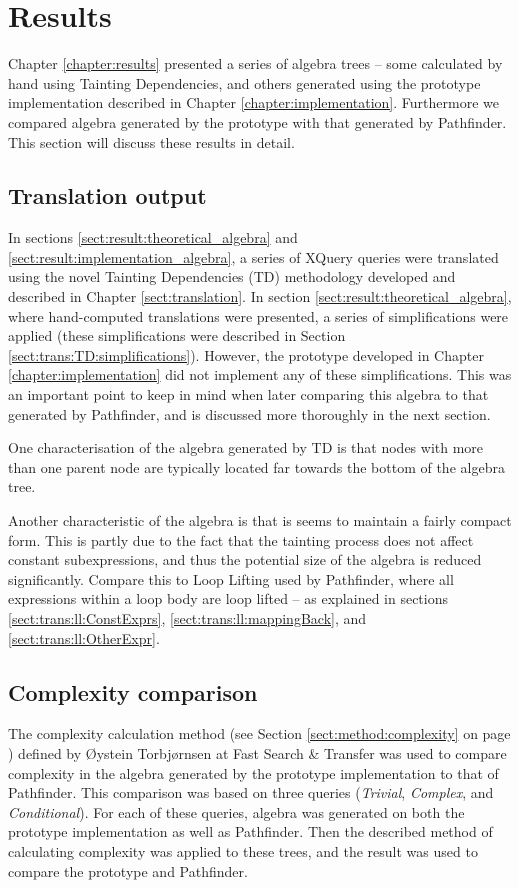 \section{Results}
\label{sect:disc:res}
Chapter \ref{chapter:results} presented a series of algebra trees --
some calculated by hand using Tainting Dependencies, and others generated using
the prototype implementation described in Chapter \ref{chapter:implementation}.
Furthermore we compared algebra generated by the prototype with that generated
by Pathfinder. This section will discuss these results in detail.

\subsection{Translation output}
\label{sect:disc:res:translation_output}
In sections \ref{sect:result:theoretical_algebra} and
\ref{sect:result:implementation_algebra}, a series of XQuery queries were
translated using the novel Tainting Dependencies (TD) methodology developed
and described in Chapter \ref{sect:translation}. In section
\ref{sect:result:theoretical_algebra}, where hand-computed translations were
presented, a series of simplifications were applied (these simplifications were
described in Section \ref{sect:trans:TD:simplifications}). However, the
prototype developed in Chapter \ref{chapter:implementation} did not implement
any of these simplifications. This was an important point to keep in mind when
later comparing this algebra to that generated by Pathfinder, and is
discussed more thoroughly in the next section.

One characterisation of the algebra generated by TD is that nodes with more
than one parent node are typically located far towards the bottom of the algebra
tree. 

Another characteristic of the algebra is that is seems to maintain a fairly
compact form. This is partly due to the fact that the tainting process does not
affect constant subexpressions, and thus the potential size of the algebra is
reduced significantly. Compare this to Loop Lifting used by
Pathfinder, where all expressions within a loop body are loop lifted --
as explained in sections \ref{sect:trans:ll:ConstExprs},
\ref{sect:trans:ll:mappingBack}, and \ref{sect:trans:ll:OtherExpr}.

\subsection{Complexity comparison}
\label{sect:disc:res:comparison}
The complexity calculation method (see Section \ref{sect:method:complexity} on
page \pageref{sect:method:complexity}) defined by \O ystein Torbj\o rnsen at
Fast Search \& Transfer was used to compare complexity in the algebra generated
by the prototype implementation to that of Pathfinder. This comparison was
based on three queries (\emph{Trivial}, \emph{Complex}, and
\emph{Conditional}). For each of these queries, algebra was generated on both
the prototype implementation as well as Pathfinder. Then the described
method of calculating complexity was applied to these trees, and the result was
used to compare the prototype and Pathfinder.


